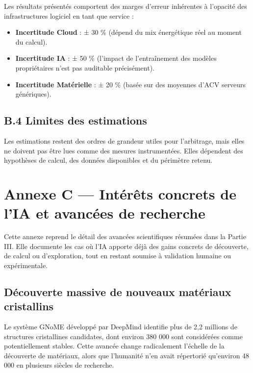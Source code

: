 \documentclass[
  10pt,
  a4paper,
  DIV=11,
  numbers=noendperiod,
  oneside]{scrreprt}
\providecommand{\tightlist}{%
  \setlength{\itemsep}{0pt}\setlength{\parskip}{0pt}}
\let\oldtextbf\textbf
\renewcommand{\textbf}[1]{\oldtextbf{\textcolor{cmmnavy}{#1}}}
\begin{document}
Les résultats présentés comportent des marges d'erreur inhérentes à
l'opacité des infrastructures logiciel en tant que service :

\begin{itemize}
\tightlist
\item
  \textbf{Incertitude Cloud} : ± 30 \% (dépend du mix énergétique réel
  au moment du calcul).
\item
  \textbf{Incertitude IA} : ± 50 \% (l'impact de l'entraînement des
  modèles propriétaires n'est pas auditable précisément).
\item
  \textbf{Incertitude Matérielle} : ± 20 \% (basée sur des moyennes
  d'ACV serveurs génériques).
\end{itemize}

\subsection{B.4 Limites des
estimations}\label{b.4-limites-des-estimations}

Les estimations restent des ordres de grandeur utiles pour l'arbitrage,
mais elles ne doivent pas être lues comme des mesures instrumentées.
Elles dépendent des hypothèses de calcul, des données disponibles et du
périmètre retenu.

\section{Annexe C --- Intérêts concrets de l'IA et avancées de
recherche}\label{annexe-c-intuxe9ruxeats-concrets-de-lia}

Cette annexe reprend le détail des avancées scientifiques résumées dans
la Partie III. Elle documente les cas où l'IA apporte déjà des gains
concrets de découverte, de calcul ou d'exploration, tout en restant
soumise à validation humaine ou expérimentale.

\subsection{Découverte massive de nouveaux matériaux
cristallins}\label{duxe9couverte-massive-de-nouveaux-matuxe9riaux-cristallins}

Le système GNoME développé par DeepMind identifie plus de 2,2 millions
de structures cristallines candidates, dont environ 380 000 sont
considérées comme potentiellement stables. Cette avancée change
radicalement l'échelle de la découverte de matériaux, alors que
l'humanité n'en avait répertorié qu'environ 48 000 en plusieurs siècles
de recherche.
\end{document}
